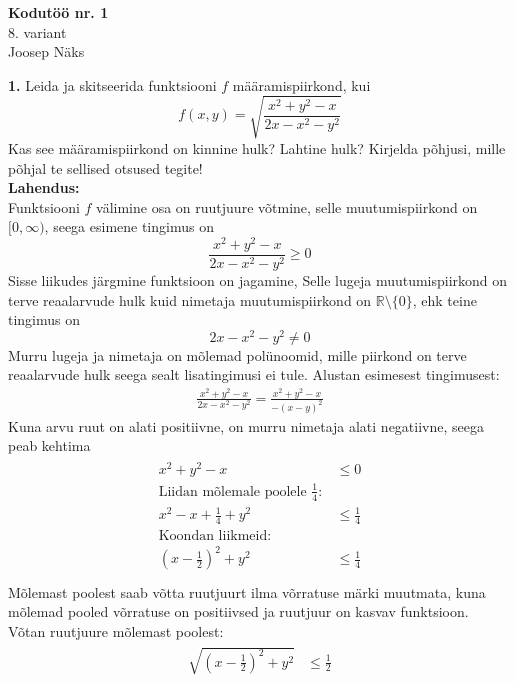 \documentclass{article}
\begin{document}
\begin{center}
\Large\textbf{Kodutöö nr. 1}\\
8. variant\\
\small{Joosep Näks}
\end{center}
\textbf{1. } Leida ja skitseerida funktsiooni $f$ määramispiirkond, kui
\begin{equation*}
f(x,y)=\sqrt{\frac{x^2+y^2-x}{2x-x^2-y^2}}
\end{equation*}
Kas see määramispiirkond on kinnine hulk? Lahtine hulk? Kirjelda põhjusi, mille põhjal te sellised otsused tegite!\\
\textbf{Lahendus:}\\
Funktsiooni $f$ välimine osa on ruutjuure võtmine, selle muutumispiirkond on $[0,\infty)$, seega esimene tingimus on
\begin{equation}
\frac{x^2+y^2-x}{2x-x^2-y^2}\geq0
\end{equation}
Sisse liikudes järgmine funktsioon on jagamine, Selle lugeja muutumispiirkond on terve reaalarvude hulk kuid nimetaja muutumispiirkond on $\mathbb{R}\setminus\{0\}$, ehk teine tingimus on
\begin{equation}
2x-x^2-y^2\neq0
\end{equation}
Murru lugeja ja nimetaja on mõlemad polünoomid, mille piirkond on terve reaalarvude hulk seega sealt lisatingimusi ei tule.
Alustan esimesest tingimusest:
\begin{gather*}
\frac{x^2+y^2-x}{2x-x^2-y^2}=\frac{x^2+y^2-x}{-(x-y)^2}
\end{gather*}
Kuna arvu ruut on alati positiivne, on murru nimetaja alati negatiivne, seega peab kehtima
\begin{gather*}
\begin{aligned}
x^2+y^2-x&\leq0\\
\text{Liidan mõlemale poolele } \frac{1}{4}:\\
x^2-x+\frac{1}{4}+y^2&\leq\frac{1}{4}\\
\text{Koondan liikmeid:}\\
\left(x-\frac{1}{2}\right)^2+y^2&\leq\frac{1}{4}\\
\end{aligned}
\end{gather*}
Mõlemast poolest saab võtta ruutjuurt ilma võrratuse märki muutmata, kuna mõlemad pooled võrratuse on positiivsed ja ruutjuur on kasvav funktsioon.\\
Võtan ruutjuure mõlemast poolest:
\begin{gather*}
\begin{aligned}
\sqrt{\left(x-\frac{1}{2}\right)^2+y^2}&\leq\frac{1}{2}\\
\end{aligned}
\end{gather*}
\end{document}
